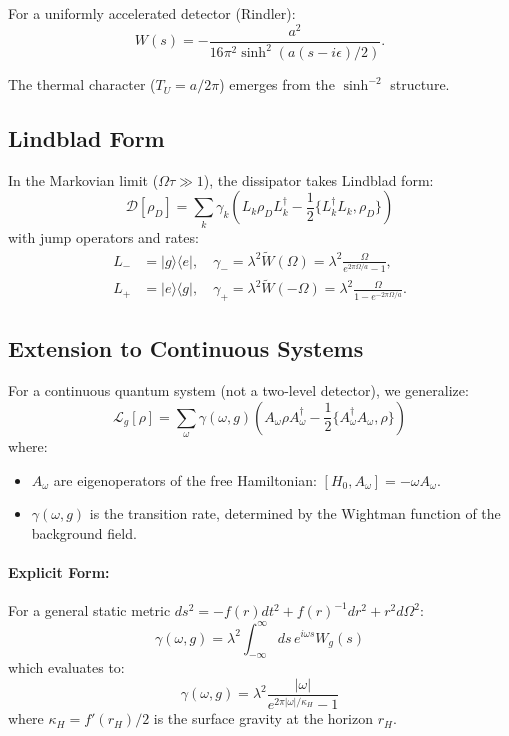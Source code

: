\documentclass[aps,prd,twocolumn,superscriptaddress,nofootinbib,floatfix]{revtex4-2}
\begin{document}
For a uniformly accelerated detector (Rindler):
\begin{equation}
    W(s) = -\frac{a^2}{16\pi^2 \sinh^2(a(s-i\epsilon)/2)}.
\end{equation}

The thermal character ($T_U = a/2\pi$) emerges from the $\sinh^{-2}$ structure.

\subsection{Lindblad Form}

In the Markovian limit ($\Omega \tau \gg 1$), the dissipator takes Lindblad form:
\begin{equation}
    \mathcal{D}[\rho_D] = \sum_k \gamma_k \left( L_k \rho_D L_k^\dagger - \frac{1}{2} \{L_k^\dagger L_k, \rho_D\} \right)
\end{equation}
with jump operators and rates:
\begin{align}
    L_- &= |g\rangle\langle e|, \quad \gamma_- = \lambda^2 \tilde{W}(\Omega) = \lambda^2 \frac{\Omega}{e^{2\pi\Omega/a} - 1}, \\
    L_+ &= |e\rangle\langle g|, \quad \gamma_+ = \lambda^2 \tilde{W}(-\Omega) = \lambda^2 \frac{\Omega}{1 - e^{-2\pi\Omega/a}}.
\end{align}

\subsection{Extension to Continuous Systems}

For a continuous quantum system (not a two-level detector), we generalize:
\begin{equation}
    \mathcal{L}_g[\rho] = \sum_\omega \gamma(\omega, g) \left( A_\omega \rho A_\omega^\dagger - \frac{1}{2} \{A_\omega^\dagger A_\omega, \rho\} \right)
\end{equation}
where:
\begin{itemize}
    \item $A_\omega$ are eigenoperators of the free Hamiltonian: $[H_0, A_\omega] = -\omega A_\omega$.
    \item $\gamma(\omega, g)$ is the transition rate, determined by the Wightman function of the background field.
\end{itemize}

\paragraph{Explicit Form:} For a general static metric $ds^2 = -f(r) dt^2 + f(r)^{-1} dr^2 + r^2 d\Omega^2$:
\begin{equation}
    \gamma(\omega, g) = \lambda^2 \int_{-\infty}^{\infty} ds \, e^{i\omega s} W_g(s)
    \label{eq:lindblad-rate}
\end{equation}
which evaluates to:
\begin{equation}
    \boxed{\gamma(\omega, g) = \lambda^2 \frac{|\omega|}{e^{2\pi|\omega|/\kappa_H} - 1}}
\end{equation}
where $\kappa_H = f'(r_H)/2$ is the surface gravity at the horizon $r_H$.
\end{document}
